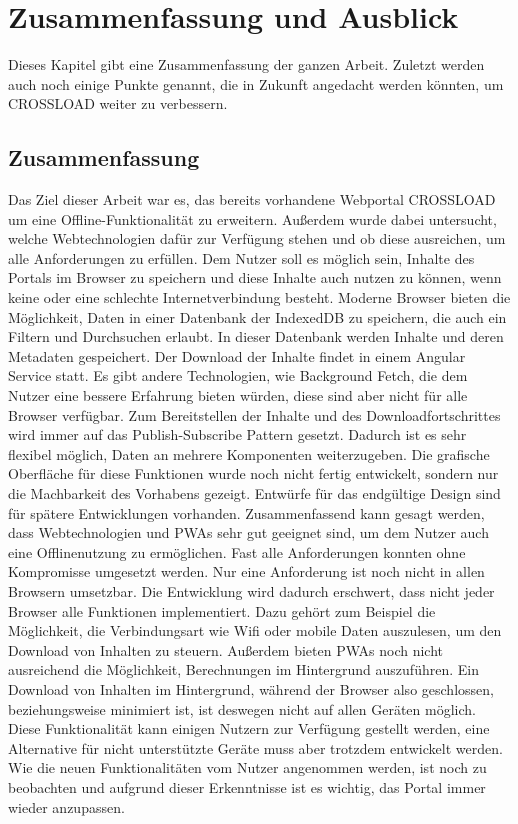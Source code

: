 \chapter{Zusammenfassung und Ausblick}
\label{Kap7}
Dieses Kapitel gibt eine Zusammenfassung der ganzen Arbeit. Zuletzt werden auch noch einige Punkte genannt, die in Zukunft angedacht werden könnten, um CROSSLOAD weiter zu verbessern.

\section{Zusammenfassung}
Das Ziel dieser Arbeit war es, das bereits vorhandene Webportal CROSSLOAD um eine Offline-Funktionalität zu erweitern. Außerdem wurde dabei untersucht, welche Webtechnologien dafür zur Verfügung stehen und ob diese ausreichen, um alle Anforderungen zu erfüllen. Dem Nutzer soll es möglich sein, Inhalte des Portals im Browser zu speichern und diese Inhalte auch nutzen zu können, wenn keine oder eine schlechte Internetverbindung besteht. Moderne Browser bieten die Möglichkeit, Daten in einer Datenbank der IndexedDB zu speichern, die auch ein Filtern und Durchsuchen erlaubt. In dieser Datenbank werden Inhalte und deren Metadaten gespeichert. Der Download der Inhalte findet in einem Angular Service statt. Es gibt andere Technologien, wie Background Fetch, die dem Nutzer eine bessere Erfahrung bieten würden, diese sind aber nicht für alle Browser verfügbar. Zum Bereitstellen der Inhalte und des Downloadfortschrittes wird immer auf das Publish-Subscribe Pattern gesetzt. Dadurch ist es sehr flexibel möglich, Daten an mehrere Komponenten weiterzugeben. Die grafische Oberfläche für diese Funktionen wurde noch nicht fertig entwickelt, sondern nur die Machbarkeit des Vorhabens gezeigt. Entwürfe für das endgültige Design sind für spätere Entwicklungen vorhanden. Zusammenfassend kann gesagt werden, dass Webtechnologien und \acp{PWA} sehr gut geeignet sind, um dem Nutzer auch eine Offlinenutzung zu ermöglichen. Fast alle Anforderungen konnten ohne Kompromisse umgesetzt werden. Nur eine Anforderung ist noch nicht in allen Browsern umsetzbar. Die Entwicklung wird dadurch erschwert, dass nicht jeder Browser alle Funktionen implementiert. Dazu gehört zum Beispiel die Möglichkeit, die Verbindungsart wie Wifi oder mobile Daten auszulesen, um den Download von Inhalten zu steuern. Außerdem bieten \acp{PWA} noch nicht ausreichend die Möglichkeit, Berechnungen im Hintergrund auszuführen. Ein Download von Inhalten im Hintergrund, während der Browser also geschlossen, beziehungsweise minimiert ist, ist deswegen nicht auf allen Geräten möglich. Diese Funktionalität kann einigen Nutzern zur Verfügung gestellt werden, eine Alternative für nicht unterstützte Geräte muss aber trotzdem entwickelt werden. Wie die neuen Funktionalitäten vom Nutzer angenommen werden, ist noch zu beobachten und aufgrund dieser Erkenntnisse ist es wichtig, das Portal immer wieder anzupassen.


